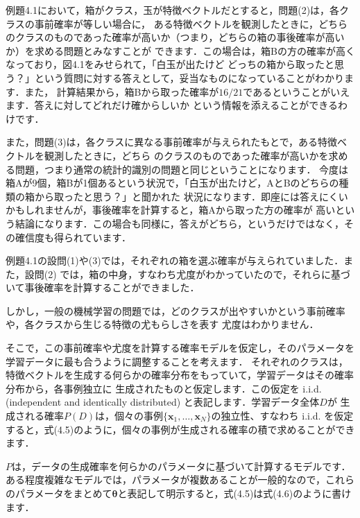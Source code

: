 
例題4.1において，箱がクラス，玉が特徴ベクトルだとすると，問題(2)は，各クラスの事前確率が等しい場合に，
ある特徴ベクトルを観測したときに，どちらのクラスのものであった確率が高いか（つまり，どちらの箱の事後確率が高いか）を求める問題とみなすことが
できます．この場合は，箱Bの方の確率が高くなっており，図4.1をみせられて，「白玉が出たけど
どっちの箱から取ったと思う？」という質問に対する答えとして，妥当なものになっていることがわかります．また，
計算結果から，箱Bから取った確率が$16/21$であるということがいえます．答えに対してどれだけ確からしいか
という情報を添えることができるわけです．

また，問題(3)は，各クラスに異なる事前確率が与えられたもとで，ある特徴ベクトルを観測したときに，どちら
のクラスのものであった確率が高いかを求める問題，つまり通常の統計的識別の問題と同じということになります．
今度は箱Aが9個，箱Bが1個あるという状況で，「白玉が出たけど，AとBのどちらの種類の箱から取ったと思う？」と聞かれた
状況になります．即座には答えにくいかもしれませんが，事後確率を計算すると，箱Aから取った方の確率が
高いという結論になります．この場合も同様に，答えがどちら，というだけではなく，その確信度も得られています．


例題4.1の設問(1)や(3)では，それぞれの箱を選ぶ確率が与えられていました．また，設問(2)
では，箱の中身，すなわち尤度がわかっていたので，それらに基づいて事後確率を計算することができました．


しかし，一般の機械学習の問題では，どのクラスが出やすいかという事前確率や，各クラスから生じる特徴の尤もらしさを表す
尤度はわかりません．

そこで，この事前確率や尤度を計算する確率モデルを仮定し，そのパラメータを学習データに最も合うように調整することを考えます．
それぞれのクラスは，特徴ベクトルを生成する何らかの確率分布をもっていて，学習データはその確率分布から，各事例独立に
生成されたものと仮定します．この仮定を
i.i.d. (independent and identically distributed) 
と表記します．学習データ全体$D$が
生成される確率$P(D)$は，個々の事例$\{\bm{x}_1,\dots,\bm{x}_N\}$の独立性、すなわち i.i.d. を仮定すると，式(4.5)のように，個々の事例が生成される確率の積で求めることができます．


$P$は，データの生成確率を何らかのパラメータに基づいて計算するモデルです．ある程度複雑なモデルでは，パラメータが複数あることが一般的なので，これらのパラメータをまとめて$\bm{\theta}$と表記して明示すると，式(4.5)は式(4.6)のように書けます．

